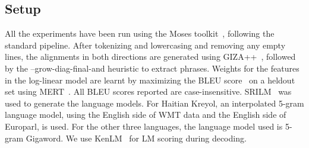 \documentclass[11pt]{article}
\begin{document}

\subsection{Setup}
	All the experiments have been run using the Moses toolkit~\cite{Koehn:07}, following the standard pipeline. After tokenizing and lowercasing and removing any empty lines, the alignments in both directions are generated using GIZA++~\cite{OchNey:03}, followed by the --grow-diag-final-and heuristic to extract phrases. Weights for the features in the log-linear model are learnt by maximizing the BLEU score~\cite{Papineni:02} on a heldout set using MERT~\cite{Och:03}. All BLEU scores reported are case-insensitive. SRILM~\cite{Stolcke:02} was used to generate the language models. For Haitian Kreyol, an interpolated 5-gram language model, using the English side of WMT data and the English side of Europarl, is used. For the other three languages, the language model used is 5-gram Gigaword. We use KenLM~\cite{Ken:11} for LM scoring during decoding. 
\end{document}
